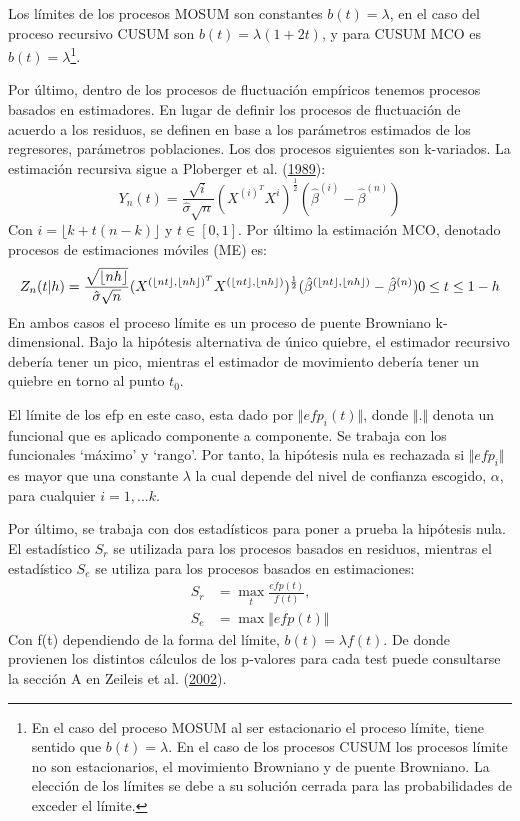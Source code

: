 \documentclass[12pt,oneside]{reedthesis}
\begin{document}
Los límites de los procesos MOSUM son constantes \(b(t) = \lambda\), en el caso del proceso recursivo CUSUM son \(b(t) = \lambda(1 + 2t)\), y para CUSUM MCO es \(b(t) = \lambda\)\footnote{En el caso del proceso MOSUM al ser estacionario el proceso límite, tiene sentido que $b(t) = \lambda$. En el caso de los procesos CUSUM los procesos límite no son estacionarios, el movimiento Browniano y de puente Browniano. La elección de los límites se debe a su solución cerrada para las probabilidades de exceder el límite.}.

Por último, dentro de los procesos de fluctuación empíricos tenemos procesos basados en estimadores. En lugar de definir los procesos de fluctuación de acuerdo a los residuos, se definen en base a los parámetros estimados de los regresores, parámetros poblaciones. Los dos procesos siguientes son k-variados.
La estimación recursiva sigue a Ploberger et al. (\protect\hyperlink{ref-Ploberger1989}{1989}):
\begin{equation}
Y_n(t) = \frac{\sqrt i}{\hat{\sigma}\sqrt n}(X^{(i)^T} X^{i})^{\frac{1}{2}}(\hat{\beta}^{(i)} - \hat{\beta}^{(n)})
\end{equation}
Con \(i = \lfloor k + t(n-k)\rfloor\) y \(t \in [0,1]\). Por último la estimación MCO, denotado procesos de estimaciones móviles (ME) es:
\begin{equation}
Z_n(t|h) = \frac{\sqrt{\lfloor nh\rfloor} }{\hat{\sigma}\sqrt{n}}(X^{(\lfloor nt \rfloor , \lfloor nh\rfloor)^T}X^{(\lfloor nt \rfloor , \lfloor nh\rfloor)})^{\frac{1}{2}}(\hat{\beta}^{(\lfloor nt \rfloor , \lfloor nh\rfloor)}-\hat{\beta}^{(n)}) \space\space\space 0 \leq t \leq 1-h
\end{equation}
En ambos casos el proceso límite es un proceso de puente Browniano k-dimensional.
Bajo la hipótesis alternativa de único quiebre, el estimador recursivo debería tener un pico, mientras el estimador de movimiento debería tener un quiebre en torno al punto \(t_0\).

El límite de los efp en este caso, esta dado por \(\Vert efp_i(t) \Vert\), donde \(\Vert . \Vert\) denota un funcional que es aplicado componente a componente. Se trabaja con los funcionales `máximo' y `rango'. Por tanto, la hipótesis nula es rechazada si \(\Vert efp_i \Vert\) es mayor que una constante \(\lambda\) la cual depende del nivel de confianza escogido, \(\alpha\), para cualquier \(i = 1,...k\).

Por último, se trabaja con dos estadísticos para poner a prueba la hipótesis nula. El estadístico \(S_r\) se utilizada para los procesos basados en residuos, mientras el estadístico \(S_e\) se utiliza para los procesos basados en estimaciones:
\begin{align}
S_r &= \max_t\frac{efp(t)}{f(t)}, \\
S_e &= \max \Vert efp(t) \Vert
\end{align}
Con f(t) dependiendo de la forma del límite, \(b(t) = \lambda f(t)\). De donde provienen los distintos cálculos de los p-valores para cada test puede consultarse la sección A en Zeileis et al. (\protect\hyperlink{ref-Zeileis2002}{2002}).
\end{document}
